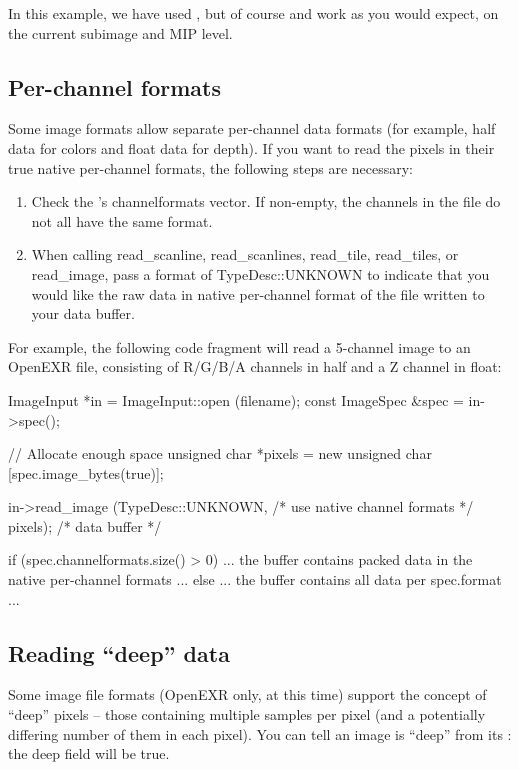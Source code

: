 In this example, we have used \readimage, but of course \readscanline
and \readtile work as you would expect, on the current subimage and MIP
level.


\subsection{Per-channel formats}
\label{sec:imageinput:channelformats}

Some image formats allow separate per-channel data formats (for example,
{\cf half} data for colors and {\cf float} data for depth).  If you want
to read the pixels in their true native per-channel formats,
the following steps are necessary:

\begin{enumerate}
\item Check the \ImageSpec's {\cf channelformats} vector.  If non-empty,
  the channels in the file do not all have the same format.
\item When calling {\cf read_scanline}, {\cf read_scanlines},
  {\cf read_tile}, {\cf read_tiles}, or {\cf read_image}, 
  pass a format of {\cf TypeDesc::UNKNOWN} to indicate that
  you would like the raw data in native per-channel format of the file
  written to your {\cf data} buffer.
\end{enumerate}

For example, the following code fragment will read a 5-channel image
to an OpenEXR file, consisting of R/G/B/A channels in {\cf half} and
a Z channel in {\cf float}:

\begin{code}
        ImageInput *in = ImageInput::open (filename);
        const ImageSpec &spec = in->spec();

        // Allocate enough space
        unsigned char *pixels = new unsigned char [spec.image_bytes(true)];

        in->read_image (TypeDesc::UNKNOWN, /* use native channel formats */
                        pixels);           /* data buffer */

        if (spec.channelformats.size() > 0) {
            ... the buffer contains packed data in the native 
                per-channel formats ...
        } else {
            ... the buffer contains all data per spec.format ...
        }
\end{code}


\subsection{Reading ``deep'' data}
\label{sec:imageinput:deepdata}  
Some image file formats (OpenEXR only, at this time) support the concept
of ``deep'' pixels -- those containing multiple samples per pixel (and a
potentially differing number of them in each pixel).
You can tell an image is ``deep'' from its \ImageSpec: the {\cf deep}
field will be {\cf true}.


